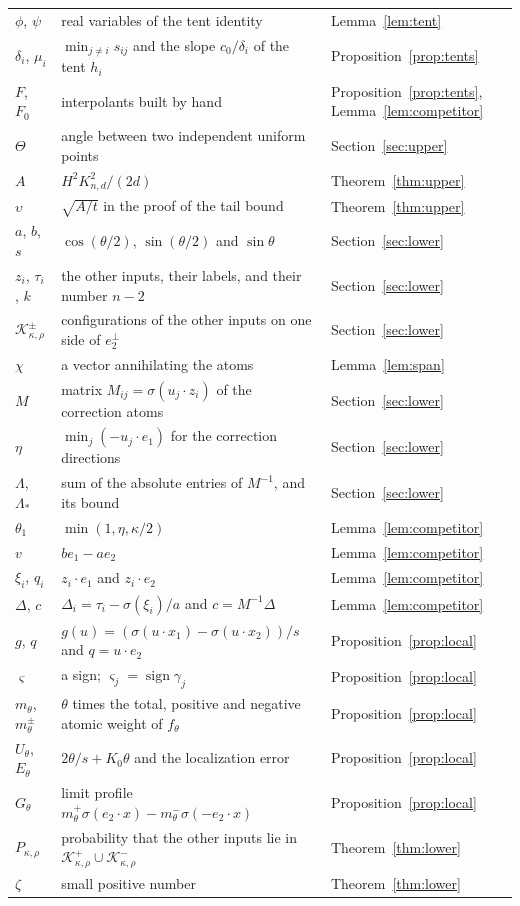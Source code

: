 \begin{longtable}{@{}lp{}p{}@{}}
$\phi$, $\psi$ & real variables of the tent identity & Lemma~\ref{lem:tent}\\
$\delta_i$, $\mu_i$ & $\min_{j\ne i}s_{ij}$ and the slope $c_0/\delta_i$ of the tent $h_i$ & Proposition~\ref{prop:tents}\\
$F$, $F_0$ & interpolants built by hand & Proposition~\ref{prop:tents}, Lemma~\ref{lem:competitor}\\
$\Theta$ & angle between two independent uniform points & Section~\ref{sec:upper}\\
$A$ & $H^2K_{n,d}^2/(2d)$ & Theorem~\ref{thm:upper}\\
$\upsilon$ & $\sqrt{A/t}$ in the proof of the tail bound & Theorem~\ref{thm:upper}\\
$a$, $b$, $s$ & $\cos(\theta/2)$, $\sin(\theta/2)$ and $\sin\theta$ & Section~\ref{sec:lower}\\
$z_i$, $\tau_i$, $k$ & the other inputs, their labels, and their number $n-2$ & Section~\ref{sec:lower}\\
$\mathcal K^\pm_{\kappa,\rho}$ & configurations of the other inputs on one side of $e_2^\perp$ & Section~\ref{sec:lower}\\
$\chi$ & a vector annihilating the atoms & Lemma~\ref{lem:span}\\
$M$ & matrix $M_{ij}=\sigma(u_j\cdot z_i)$ of the correction atoms & Section~\ref{sec:lower}\\
$\eta$ & $\min_j(-u_j\cdot e_1)$ for the correction directions & Section~\ref{sec:lower}\\
$\Lambda$, $\Lambda_*$ & sum of the absolute entries of $M^{-1}$, and its bound & Section~\ref{sec:lower}\\
$\theta_1$ & $\min(1,\eta,\kappa/2)$ & Lemma~\ref{lem:competitor}\\
$v$ & $be_1-ae_2$ & Lemma~\ref{lem:competitor}\\
$\xi_i$, $q_i$ & $z_i\cdot e_1$ and $z_i\cdot e_2$ & Lemma~\ref{lem:competitor}\\
$\Delta$, $c$ & $\Delta_i=\tau_i-\sigma(\xi_i)/a$ and $c=M^{-1}\Delta$ & Lemma~\ref{lem:competitor}\\
$g$, $q$ & $g(u)=(\sigma(u\cdot x_1)-\sigma(u\cdot x_2))/s$ and $q=u\cdot e_2$ & Proposition~\ref{prop:local}\\
$\varsigma$ & a sign; $\varsigma_j=\operatorname{sign}\gamma_j$ & Proposition~\ref{prop:local}\\
$m_\theta$, $m^\pm_\theta$ & $\theta$ times the total, positive and negative atomic weight of $f_\theta$ & Proposition~\ref{prop:local}\\
$U_\theta$, $E_\theta$ & $2\theta/s+K_0\theta$ and the localization error & Proposition~\ref{prop:local}\\
$G_\theta$ & limit profile $m^+_\theta\sigma(e_2\cdot x)-m^-_\theta\sigma(-e_2\cdot x)$ & Proposition~\ref{prop:local}\\
$P_{\kappa,\rho}$ & probability that the other inputs lie in $\mathcal K^+_{\kappa,\rho}\cup\mathcal K^-_{\kappa,\rho}$ & Theorem~\ref{thm:lower}\\
$\zeta$ & small positive number & Theorem~\ref{thm:lower}\\
\bottomrule
\end{longtable}
